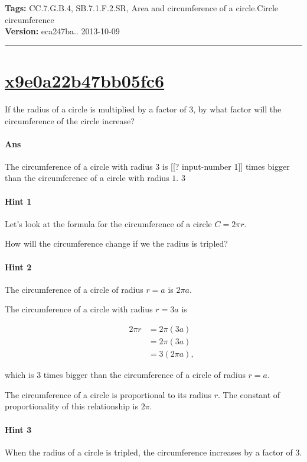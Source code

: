 \documentclass[twocolumn,10pt]{article}
\begin{document}
\medskip
\noindent
\textbf{Tags:} {\footnotesize CC.7.G.B.4, SB.7.1.F.2.SR, Area and circumference of a circle.Circle circumference}\\
\textbf{Version:} eca247ba.. 2013-10-09
\smallskip\hrule





\section{\href{https://www.khanacademy.org/devadmin/content/items/x9e0a22b47bb05fc6}{x9e0a22b47bb05fc6}}

\noindent
If the radius of a circle is multiplied by a factor of $3$, by what factor will the circumference of the circle increase?

\paragraph{Ans} The circumference of a circle with radius $3$ is [[? input-number 1]] times bigger than the circumference of a circle with radius $1$.  3

\paragraph{Hint 1}Let's look at the formula for the circumference of a circle $C=2\pi r$.  

How will the circumference change if we the radius is tripled?

\paragraph{Hint 2}The circumference of a circle of radius $r=a$ is $2\pi a$.

The circumference of a circle with radius $r=3a$ is 

\begin{align*}
\qquad 
 2\pi r & =2\pi (3a)  \\
  & =2\pi(3a) \\
  &= 3(2\pi a),
\end{align*}   

which is $3$ times bigger than the circumference of a circle of radius $r=a$. 

The circumference of a circle is proportional to its radius $r$. The constant of proportionality of this relationship is $2\pi$.

\paragraph{Hint 3}When the radius of a circle is tripled, the circumference increases by a factor of $3$.
\end{document}
